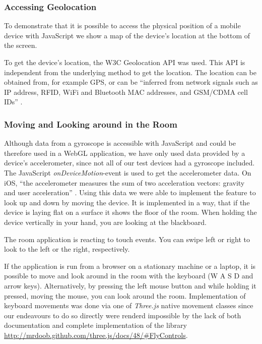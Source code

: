 \documentclass[12pt,journal,compsoc]{IEEEtran}
\begin{document}
\subsubsection{Accessing Geolocation}
To demonstrate that it is possible to access the physical position of a mobile device with JavaScript we show a map of the device’s location at the bottom of the screen. 

To get the device’s location, the W3C Geolocation API \cite{locationAPI} was used. This API is independent from the underlying method to get the location. The location can be obtained from, for example GPS, or can be “inferred from network signals such as IP address, RFID, WiFi and Bluetooth MAC addresses, and GSM/CDMA cell IDs” \cite{locationAPI}. 

\subsubsection{Moving and Looking around in the Room}
Although data from a gyroscope is accessible with JavaScript and could be therefore used in a WebGL application, we have only used data provided by a device’s accelerometer, since not all of our test devices had a gyroscope included. The JavaScript \textit{onDeviceMotion}-event is used to get the accelerometer data. On iOS, “the accelerometer measures the sum of two acceleration vectors: gravity and user acceleration” \cite{CMDeviceMotion}. Using this data we were able to implement the feature to look up and down by moving the device. It is implemented in a way, that if the device is laying flat on a surface it shows the floor of the room. When holding the device vertically in your hand, you are looking at the blackboard.

The room application is reacting to touch events. You can swipe left or right to look to the left or the right, respectively.

If the application is run from a browser on a stationary machine or a laptop, it is possible to  move and look around in the room with the keyboard (W A S D and arrow keys). Alternatively, by pressing the left mouse button and while holding it pressed, moving the mouse, you can look around the room. Implementation of keyboard movements was done via one of \textit{Three.js} native movement classes since our endeavours to do so directly were renderd impossible by the lack of both documentation and complete implementation of the library \url{http://mrdoob.github.com/three.js/docs/48/#FlyControls}.
\end{document}
